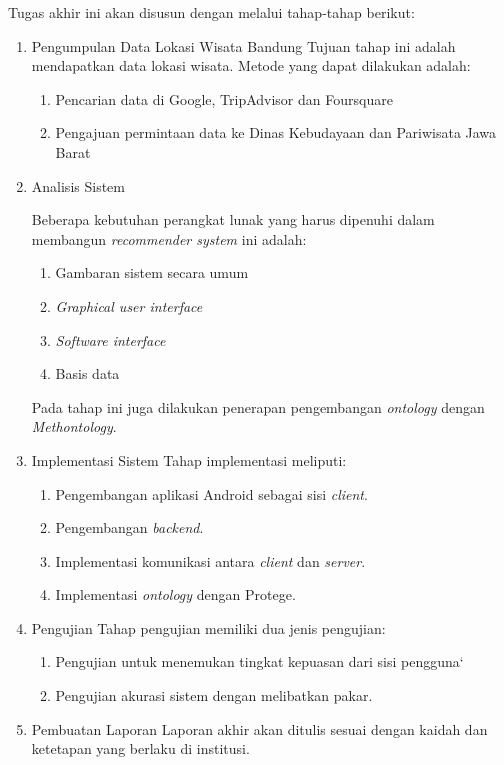Tugas akhir ini akan disusun dengan melalui tahap-tahap berikut:
\begin{enumerate}
\item Pengumpulan Data Lokasi Wisata Bandung
\newline
Tujuan tahap ini adalah mendapatkan data lokasi wisata. Metode yang dapat dilakukan adalah:
\begin{enumerate}
	\item Pencarian data di Google, TripAdvisor dan Foursquare
	\item Pengajuan permintaan data ke Dinas Kebudayaan dan Pariwisata Jawa Barat
\end{enumerate}

\item Analisis Sistem
\par
Beberapa kebutuhan perangkat lunak yang harus dipenuhi dalam membangun \textit{recommender system} ini
adalah:
\begin{enumerate}
	\item Gambaran sistem secara umum
	\item \textit{Graphical user interface}
	\item \textit{Software interface}
	\item Basis data
\end{enumerate}
 
Pada tahap ini juga dilakukan penerapan pengembangan \textit{ontology} dengan \textit{Methontology}.

\item Implementasi Sistem
\newline
Tahap implementasi meliputi:
\begin{enumerate}
	\item Pengembangan aplikasi Android sebagai sisi \textit{client}.
	\item Pengembangan \textit{backend}.
	\item Implementasi komunikasi antara \textit{client} dan \textit{server}. 
	\item Implementasi \textit{ontology} dengan Protege.
\end{enumerate}
 
\item Pengujian
\newline
Tahap pengujian memiliki dua jenis pengujian:
\begin{enumerate}
	\item Pengujian untuk menemukan tingkat kepuasan dari sisi pengguna`
	\item Pengujian akurasi sistem dengan melibatkan pakar. 
\end{enumerate}

\item Pembuatan Laporan
\newline 
Laporan akhir akan ditulis sesuai dengan kaidah dan ketetapan yang berlaku di institusi.
\end{enumerate}


